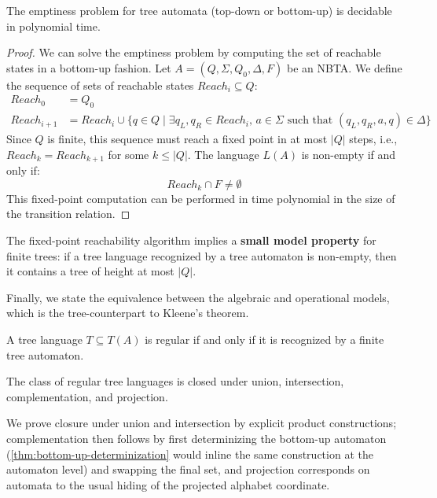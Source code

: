 \begin{theorem}
The emptiness problem for tree automata (top-down or bottom-up) is decidable in polynomial time.
\end{theorem}

\begin{proof}
We can solve the emptiness problem by computing the set of reachable states in a bottom-up fashion. Let $A = (Q, \Sigma, Q_0, \Delta, F)$ be an NBTA. We define the sequence of sets of reachable states $Reach_i \subseteq Q$:
\begin{align*}
    Reach_0 &= Q_0 \\
    Reach_{i+1} &= Reach_i \cup \{ q \in Q \mid \exists q_L, q_R \in Reach_i, \, a \in \Sigma \text{ such that } (q_L, q_R, a, q) \in \Delta \}
\end{align*}
Since $Q$ is finite, this sequence must reach a fixed point in at most $|Q|$ steps, i.e., $Reach_k = Reach_{k+1}$ for some $k \le |Q|$. The language $L(A)$ is non-empty if and only if:
$$Reach_k \cap F \neq \emptyset$$
This fixed-point computation can be performed in time polynomial in the size of the transition relation.
\end{proof}

\begin{summarybox}
The fixed-point reachability algorithm implies a \textbf{small model property} for finite trees: if a tree language recognized by a tree automaton is non-empty, then it contains a tree of height at most $|Q|$.
\end{summarybox}

Finally, we state the equivalence between the algebraic and operational models, which is the tree-counterpart to Kleene's theorem.

\begin{theorem}
A tree language $T \subseteq T(A)$ is regular if and only if it is recognized by a finite tree automaton.
\end{theorem}

\begin{theorem}\label{thm:tree-boolean-closure}
The class of regular tree languages is closed under union, intersection, complementation, and projection.
\end{theorem}

We prove closure under union and intersection by explicit product constructions; complementation then follows by first determinizing the bottom-up automaton (\cref{thm:bottom-up-determinization} would inline the same construction at the automaton level) and swapping the final set, and projection corresponds on automata to the usual hiding of the projected alphabet coordinate.

